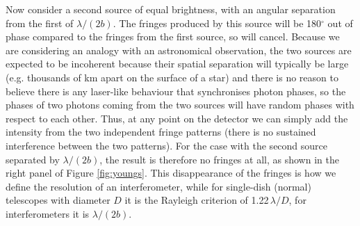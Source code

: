 \documentclass[11pt]{article}
\begin{document}
Now consider a second source of equal brightness, with an angular separation from the first of $\lambda/(2b)$. The fringes produced by this source will be 180$^\circ$ out of phase compared to the fringes from the first source, so will cancel. Because we are considering an analogy with an astronomical observation, the two sources are expected to be incoherent because their spatial separation will typically be large (e.g. thousands of km apart on the surface of a star) and there is no reason to believe there is any laser-like behaviour that synchronises photon phases, so the phases of two photons coming from the two sources will have random phases with respect to each other. Thus, at any point on the detector we can simply add the intensity from the two independent fringe patterns (there is no sustained interference between the two patterns). For the case with the second source separated by $\lambda/(2b)$, the result is therefore no fringes at all, as shown in the right panel of Figure \ref{fig:youngs}. This disappearance of the fringes is how we define the resolution of an interferometer, while for single-dish (normal) telescopes with diameter $D$ it is the Rayleigh criterion of 1.22\,$\lambda/D$, for interferometers it is $\lambda/(2b)$.
\end{document}
